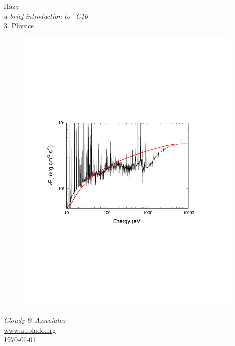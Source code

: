 \documentclass[12pt]{book}
\begin{document}
\frontmatter

\begin{titlepage}
\begin{center}

\Huge
Hazy\\
\Large
\emph{a brief introduction to \Cloudy\ C10}\\
\LARGE
3. Physics

\begin{figure}
\begin{center}
\includegraphics[clip=on,width=1.0\columnwidth,keepaspectratio]{WarmAbsorberReynoldsFabian}
\end{center}
\end{figure}

\vspace{15 mm }
\LARGE
\emph{Cloudy \& Associates} \\
\Large
\href{http://www.nublado.org}{www.nublado.org} \\
\normalsize
\today
\end{center}
\end{titlepage}
\end{document}
